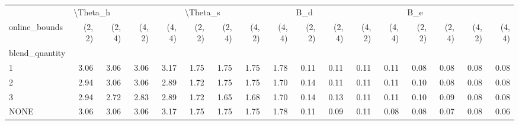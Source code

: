 \begin{tabular}{lrrrrrrrrrrrrrrrr}
\toprule
{} & \multicolumn{4}{l}{\textbackslash Theta\_h} & \multicolumn{4}{l}{\textbackslash Theta\_s} & \multicolumn{4}{l}{B\_d} & \multicolumn{4}{l}{B\_e} \\
online\_bounds &   (2, 2) & (2, 4) & (4, 2) & (4, 4) &   (2, 2) & (2, 4) & (4, 2) & (4, 4) & (2, 2) & (2, 4) & (4, 2) & (4, 4) & (2, 2) & (2, 4) & (4, 2) & (4, 4) \\
blend\_quantity &          &        &        &        &          &        &        &        &        &        &        &        &        &        &        &        \\
\midrule
1              &     3.06 &   3.06 &   3.06 &   3.17 &     1.75 &   1.75 &   1.75 &   1.78 &   0.11 &   0.11 &   0.11 &   0.11 &   0.08 &   0.08 &   0.08 &   0.08 \\
2              &     2.94 &   3.06 &   3.06 &   2.89 &     1.72 &   1.75 &   1.75 &   1.70 &   0.14 &   0.11 &   0.11 &   0.11 &   0.10 &   0.08 &   0.08 &   0.08 \\
3              &     2.94 &   2.72 &   2.83 &   2.89 &     1.72 &   1.65 &   1.68 &   1.70 &   0.14 &   0.13 &   0.11 &   0.11 &   0.10 &   0.09 &   0.08 &   0.08 \\
NONE           &     3.06 &   3.06 &   3.06 &   3.17 &     1.75 &   1.75 &   1.75 &   1.78 &   0.11 &   0.09 &   0.11 &   0.08 &   0.08 &   0.07 &   0.08 &   0.06 \\
\bottomrule
\end{tabular}
